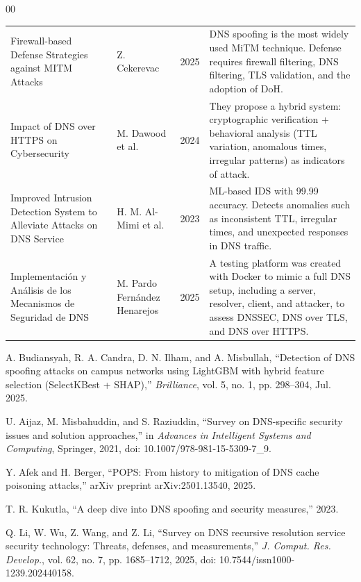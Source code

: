 \documentclass[conference]{IEEEtran}
\begin{document}
\begin{thebibliography}{00}
\begin{table}[htbp]
\begin{tabular}{@{}p{4cm} p{2.5cm} p{1cm} p{9.2cm}@{}}
Firewall-based Defense Strategies against MITM Attacks
& Z. Cekerevac
& 2025
& DNS spoofing is the most widely used MiTM technique. Defense requires firewall filtering, DNS filtering, TLS validation, and the adoption of DoH. \\

Impact of DNS over HTTPS on Cybersecurity
& M. Dawood et al.

& 2024
& They propose a hybrid system: cryptographic verification + behavioral analysis (TTL variation, anomalous times, irregular patterns) as indicators of attack. \\

Improved Intrusion Detection System to Alleviate Attacks on DNS Service
& H. M. Al-Mimi et al.

& 2023
& ML-based IDS with 99.99 accuracy. Detects anomalies such as inconsistent TTL, irregular times, and unexpected responses in DNS traffic. \\


Implementación y Análisis de los Mecanismos de Seguridad de DNS
& M. Pardo Fernández Henarejos
& 2025
& A testing platform was created with Docker to mimic a full DNS setup, including a server, resolver, client, and attacker, to assess DNSSEC, DNS over TLS, and DNS over HTTPS. \\ \hline

\end{tabular}
\end{table}


A. Budiansyah, R. A. Candra, D. N. Ilham, and A. Misbullah, ``Detection of DNS spoofing attacks on campus networks using LightGBM with hybrid feature selection (SelectKBest + SHAP),'' \textit{Brilliance}, vol. 5, no. 1, pp. 298--304, Jul. 2025.

U. Aijaz, M. Misbahuddin, and S. Raziuddin, ``Survey on DNS-specific security issues and solution approaches,'' in \textit{Advances in Intelligent Systems and Computing}, Springer, 2021, doi: 10.1007/978-981-15-5309-7\_9.

Y. Afek and H. Berger, ``POPS: From history to mitigation of DNS cache poisoning attacks,'' arXiv preprint arXiv:2501.13540, 2025.

T. R. Kukutla, ``A deep dive into DNS spoofing and security measures,'' 2023.

Q. Li, W. Wu, Z. Wang, and Z. Li, ``Survey on DNS recursive resolution service security technology: Threats, defenses, and measurements,'' \textit{J. Comput. Res. Develop.}, vol. 62, no. 7, pp. 1685--1712, 2025, doi: 10.7544/issn1000-1239.202440158.


\end{thebibliography}
\end{document}
